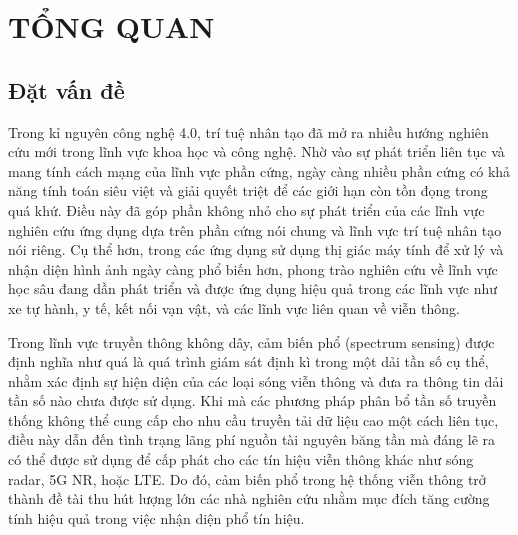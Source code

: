 \chapter{TỔNG QUAN}
\section{Đặt vấn đề}
Trong kỉ nguyên công nghệ 4.0, trí tuệ nhân tạo đã mở ra nhiều hướng nghiên cứu mới trong lĩnh vực khoa học và công nghệ. Nhờ vào sự phát triển liên tục và mang tính cách mạng của lĩnh vực phần cứng, ngày càng nhiều phần cứng có khả năng tính toán siêu việt và giải quyết triệt để các giới hạn còn tồn đọng trong quá khứ. Điều này đã góp phần không nhỏ cho sự phát triển của các lĩnh vực nghiên cứu ứng dụng dựa trên phần cứng nói chung và lĩnh vực trí tuệ nhân tạo nói riêng. Cụ thể hơn, trong các ứng dụng sử dụng thị giác máy tính để xử lý và nhận diện hình ảnh ngày càng phổ biến hơn, phong trào nghiên cứu về lĩnh vực học sâu đang dần phát triển và được ứng dụng hiệu quả trong các lĩnh vực như xe tự hành, y tế, kết nối vạn vật, và các lĩnh vực liên quan về viễn thông.

Trong lĩnh vực truyền thông không dây, cảm biến phổ (spectrum sensing) được định nghĩa như quá là quá trình giám sát định kì trong một dải tần số cụ thể, nhằm xác định sự hiện diện của các loại sóng viễn thông và đưa ra thông tin dải tần số nào chưa được sử dụng. Khi mà các phương pháp phân bổ tần số truyền thống không thể cung cấp cho nhu cầu truyền tải dữ liệu cao một cách liên tục, điều này dẫn đến tình trạng lãng phí nguồn tài nguyên băng tần mà đáng lẽ ra có thể được sử dụng để cấp phát cho các tín hiệu viễn thông khác như sóng radar, 5G NR, hoặc LTE. Do đó, cảm biến phổ trong hệ thống viễn thông trở thành đề tài thu hút lượng lớn các nhà nghiên cứu nhằm mục đích tăng cường tính hiệu quả trong việc nhận diện phổ tín hiệu. 

